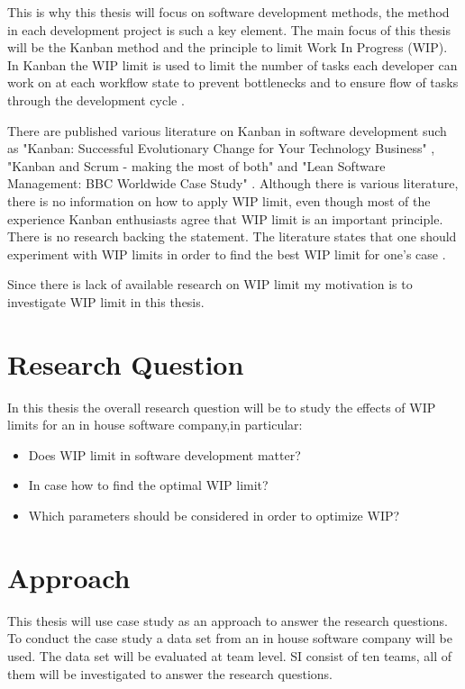 \documentclass[UKenglish]{ifimaster}  %
\begin{document}
This is why this thesis will focus on software development methods, the method in each development project is such a key element. The main focus of this thesis will be the Kanban method and the principle to limit Work In Progress (WIP). In Kanban the WIP limit is used to  limit the number of tasks each developer can work on at each workflow state to prevent bottlenecks and to ensure flow of tasks through the development cycle \parencite{gandomani2013important} \parencite{ikonen2010exploring}.

There are published various literature on Kanban in software development such as "Kanban: Successful Evolutionary Change for Your Technology Business" \parencite{0984521402}, "Kanban and Scrum - making the most of both"  \parencite{Kniberg} and "Lean Software Management: BBC Worldwide Case Study" \parencite{Joyce}. Although there is various literature, there is no information on how to apply WIP limit, even though most of the experience Kanban enthusiasts agree that WIP limit is an important principle.  There is no research backing the statement.  The literature states that one should experiment with WIP limits in order to find the best WIP limit for one's case \parencite{Ikonen} \parencite{Kniberg}.

Since there is lack of available research on WIP limit my motivation is to investigate WIP limit in this thesis.

\section{Research Question}
\label{chap:RQ}
In this thesis the overall research question will be to study the effects of WIP limits for an in house software company,in particular:
\begin{itemize}
\item Does WIP limit in software development matter?
\item In case how to find the optimal WIP limit?
\item Which parameters should be considered in order to optimize WIP? 
\end{itemize}


\section{Approach}
This thesis will use case study as an approach  to answer the research questions. To conduct the case study a data set from an in house software company will be used.  The data set will be evaluated at team level. SI consist of ten teams, all of them will be investigated to answer the research questions. 
\end{document}

